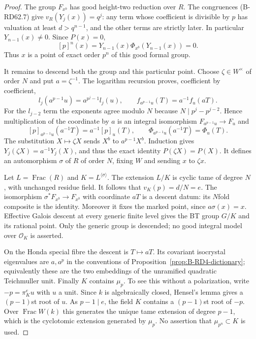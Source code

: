 \begin{proof}
The group $F_{x^b}$ has good height-two reduction over $R$.
The congruences (B-RD62.7) give $v_R(Y_j(x))=q^j$: any term whose
coefficient is divisible by $p$ has valuation at least $d>q^{n-1}$,
and the other terms are strictly later.  In particular
$Y_{n-1}(x)\ne0$.  Since $P(x)=0$,
\[
 [p]^n(x)=Y_{n-1}(x)\Phi_{x^b}(Y_{n-1}(x))=0.
\]
Thus $x$ is a point of exact order $p^n$ of this good formal group.

It remains to descend both the group and this particular point.
Choose $\zeta\in W^\times$ of order $N$ and put $a=\zeta^{-1}$.
The logarithm recursion proves, coefficient by coefficient,
\[
 l_j(a^{p-1}u)=a^{p^j-1}l_j(u),\qquad
 f_{a^{p-1}u}(T)=a^{-1}f_u(aT).                         \tag{B-RD62.9}
\]
For the $l_{j-2}$ term the exponents agree modulo $N$ because
$N\mid p^j-p^{j-2}$.  Hence multiplication of the coordinate by $a$
is an integral isomorphism $F_{a^{p-1}u}\to F_u$ and
\[
 [p]_{a^{p-1}u}(a^{-1}T)=a^{-1}[p]_u(T),\qquad
 \Phi_{a^{p-1}u}(a^{-1}T)=\Phi_u(T).                    \tag{B-RD62.10}
\]
The substitution $X\mapsto\zeta X$ sends $X^b$ to $a^{p-1}X^b$.
Induction gives $Y_j(\zeta X)=a^{-1}Y_j(X)$, and thus the exact
identity $P(\zeta X)=P(X)$.  It defines an automorphism $\sigma$ of
$R$ of order $N$, fixing $W$ and sending $x$ to $\zeta x$.

Let $L=\operatorname{Frac}(R)$ and $K=L^{\langle\sigma\rangle}$.
The extension $L/K$ is cyclic tame of degree $N$, with unchanged
residue field.  It follows that $v_K(p)=d/N=e$.
The isomorphism $\sigma^*F_{x^b}\to F_{x^b}$ with coordinate $aT$
is a descent datum: its $N$fold composite is the identity.
Moreover it fixes the marked point, since $a\sigma(x)=x$.
Effective Galois descent at every generic finite level gives the
BT group $G/K$ and its rational point.  Only the generic group is
descended; no good integral model over $\mathcal O_K$ is asserted.

On the Honda special fibre the descent is $T\mapsto aT$.
Its covariant isocrystal eigenvalues are $a,a^p$ in the conventions
of Proposition~\ref{prop:B-RD4-dictionary}; equivalently these are
the two embeddings of the unramified quadratic Teichmuller unit.
Finally $K$ contains $\mu_p$.  To see this without a polarization,
write $-p=\pi_K^e u$ with $u$ a unit.  Since $k$ is algebraically
closed, Hensel's lemma gives a $(p-1)$st root of $u$.  As $p-1\mid e$,
the field $K$ contains a $(p-1)$st root of $-p$.  Over
$\operatorname{Frac}W(k)$ this generates the unique tame extension
of degree $p-1$, which is the cyclotomic extension generated by
$\mu_p$.  No assertion that $\mu_{p^n}\subset K$ is used.
\end{proof}

